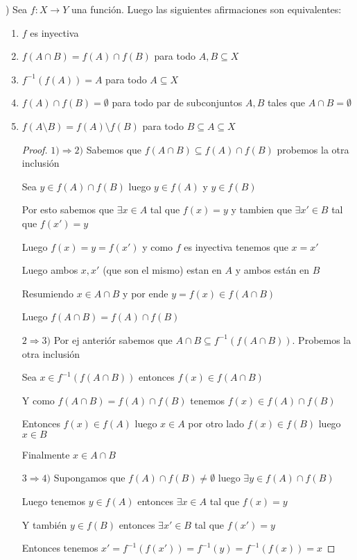 \documentclass[12pt]{article}
\newcommand{\Ra}{\Rightarrow}
\newcommand{\ra}{\rightarrow}
\theoremstyle{definition}
\begin{document}
) Sea $f: X \ra Y$ una función. Luego las siguientes afirmaciones son equivalentes:
\begin{enumerate}
  \item $f$ es inyectiva
  \item $f(A \cap B) = f(A) \cap f(B)$ para todo $A,B \subseteq X$
  \item $f^{-1}(f(A)) = A$ para todo $A \subseteq X$
  \item $f(A) \cap f(B) = \emptyset$ para todo par de subconjuntos $A,B $ tales que $A \cap B = \emptyset$
  \item $f(A \setminus B) = f(A) \setminus f(B)$ para todo $B \subseteq A \subseteq X$
    \begin{proof}
  $1) \Ra 2)$ Sabemos que $f(A \cap B) \subseteq f(A) \cap f(B)$ probemos la otra inclusión
  
  Sea $y \in f(A) \cap f(B)$ luego $y \in f(A)$ y $y \in f(B)$ 

  Por esto sabemos que $\exists x \in A$ tal que $f(x) = y$ y tambien que $\exists x' \in B$ tal que $f(x') = y$

  Luego $f(x) = y = f(x')$ y como $f$ es inyectiva tenemos que $x = x'$

  Luego ambos $x,x' $ (que son el mismo) estan en $A$ y ambos están en $B$

  Resumiendo $x \in A \cap B$ y por ende $y = f(x) \in f(A \cap B)$

  Luego $f(A \cap B) = f(A) \cap f(B)$

$2 \Ra 3)$ Por ej anteriór sabemos que $A \cap B \subseteq f^{-1}(f(A \cap B))$. Probemos la otra inclusión 

Sea $x \in f^{-1}(f(A \cap B))$ entonces $f(x) \in f(A \cap B)$

Y como $f(A \cap B) = f(A) \cap f(B)$ tenemos $f(x) \in f(A) \cap f(B)$  

Entonces $f(x) \in f(A)$ luego $x \in A$ por otro lado $f(x) \in f(B)$ luego $x \in B$

Finalmente $x \in A \cap B$

$3 \Ra 4 )$ Supongamos que $f(A) \cap f(B) \neq \emptyset$ luego $\exists y \in f(A) \cap f(B)$

Luego tenemos $y \in f(A)$ entonces $\exists x \in A$ tal que $f(x) = y$

Y también $y \in f(B)$ entonces $\exists x' \in B$ tal que $f(x') = y$

Entonces tenemos $x' = f^{-1}(f(x')) = f^{-1}(y) = f^{-1}(f(x)) = x$


\end{proof}
\end{enumerate}
\end{document}
